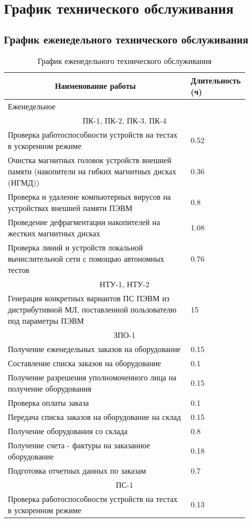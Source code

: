 \documentclass[a4paper,14pt]{extarticle}
\begin{document}
\section{График технического обслуживания}

\subsection*{График еженедельного технического обслуживания}

\begin{center}
	\begin{table}[htbp]

	\begin{tabular}{|p{0.75\linewidth}|m{0.23\linewidth}|}
		\hline
		\multicolumn{1}{|c|}{Наименование работы} & Длительность (ч) \\ \hline
		\multicolumn{ 2}{|l|}{Еженедельное} \\ \hline
		\multicolumn{ 2}{|c|}{ПК-1, ПК-2, ПК-3, ПК-4} \\ \hline
		Проверка работоспособности устройств на тестах в ускоренном режиме  & 0.52 \\ \hline
		Очистка магнитных головок устройств внешней памяти (накопители на гибких магнитных дисках (НГМД))  & 0.36 \\ \hline
		Проверка и удаление компьютерных вирусов на устройствах внешней памяти ПЭВМ  & 0.8 \\ \hline
		Проведение дефрагментации накопителей на жестких магнитных дисках  & 1.08 \\ \hline
		Проверка линий и устройств локальной вычислительной сети с помощью автономных тестов  & 0.76 \\ \hline
		\multicolumn{ 2}{|c|}{НТУ-1, НТУ-2} \\ \hline
		Генерация конкретных вариантов ПС ПЭВМ из дистрибутивной МЛ, поставленной пользователю под параметры ПЭВМ & 15 \\ \hline
		\multicolumn{ 2}{|c|}{ЗПО-1} \\ \hline
		Получение еженедельных заказов на оборудование  & 0.15 \\ \hline
		Составление списка заказов на оборудование  & 0.1 \\ \hline
		Получение разрешения уполномоченного лица на получение оборудования  & 0.15 \\ \hline
		Проверка оплаты заказа  & 0.1 \\ \hline
		Передача списка заказов на оборудование на склад  & 0.15 \\ \hline
		Получение оборудования со склада  & 0.8 \\ \hline
		Получение счета - фактуры на заказанное оборудование  & 0.18 \\ \hline
		Подготовка отчетных данных по заказам  & 0.7 \\ \hline
		\multicolumn{ 2}{|c|}{ПС-1} \\ \hline
		Проверка работоспособности устройств на тестах в ускоренном режиме & 0.13 \\ \hline
	\end{tabular}
	\caption{График еженедельного технического обслуживания}
	\label{tab:week}
\end{table}
\end{center}
\newpage
\end{document}
